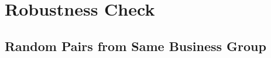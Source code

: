 \documentclass{beamer}
\begin{document}
%				
%		
%		
%	
%	
%	
%	
%		
%		
%		
%	
%	
%	
%				
%		
%		
%	
%	
%		
%		
%		
%			
%			
%			
%		
	
	
	
	
	
	\section{Robustness Check}
	
	\subsection{Random Pairs from Same Business Group}
	
\end{document}

